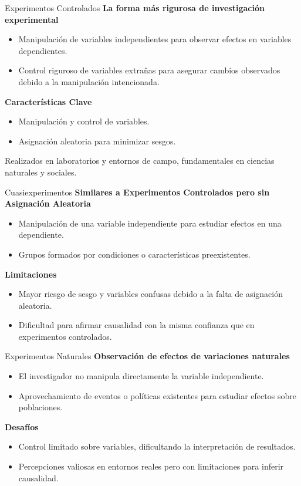 ﻿\documentclass{beamer}
\begin{document}
\begin{frame}{Experimentos Controlados}
    \textbf{La forma más rigurosa de investigación experimental}
    \begin{itemize}
        \item Manipulación de variables independientes para observar efectos en variables dependientes.
        \item Control riguroso de variables extrañas para asegurar cambios observados debido a la manipulación intencionada.
    \end{itemize}

    \textbf{Características Clave}
    \begin{itemize}
        \item Manipulación y control de variables.
        \item Asignación aleatoria para minimizar sesgos.
    \end{itemize}

    Realizados en laboratorios y entornos de campo, fundamentales en ciencias naturales y sociales.
\end{frame}

\begin{frame}{Cuasiexperimentos}
    \textbf{Similares a Experimentos Controlados pero sin Asignación Aleatoria}
    \begin{itemize}
        \item Manipulación de una variable independiente para estudiar efectos en una dependiente.
        \item Grupos formados por condiciones o características preexistentes.
    \end{itemize}

    \textbf{Limitaciones}
    \begin{itemize}
        \item Mayor riesgo de sesgo y variables confusas debido a la falta de asignación aleatoria.
        \item Dificultad para afirmar causalidad con la misma confianza que en experimentos controlados.
    \end{itemize}
\end{frame}

\begin{frame}{Experimentos Naturales}
    \textbf{Observación de efectos de variaciones naturales}
    \begin{itemize}
        \item El investigador no manipula directamente la variable independiente.
        \item Aprovechamiento de eventos o políticas existentes para estudiar efectos sobre poblaciones.
    \end{itemize}

    \textbf{Desafíos}
    \begin{itemize}
        \item Control limitado sobre variables, dificultando la interpretación de resultados.
        \item Percepciones valiosas en entornos reales pero con limitaciones para inferir causalidad.
    \end{itemize}
\end{frame}
\end{document}

